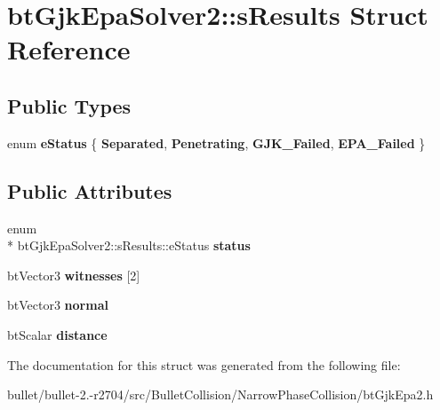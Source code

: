 \hypertarget{structbt_gjk_epa_solver2_1_1s_results}{\section{bt\+Gjk\+Epa\+Solver2\+:\+:s\+Results Struct Reference}
\label{structbt_gjk_epa_solver2_1_1s_results}
}
\subsection*{Public Types}
\begin{DoxyCompactItemize}
\item 
\hypertarget{structbt_gjk_epa_solver2_1_1s_results_afc87a476b5c94b203dec0b0d2f17e1b7}{enum {\bfseries e\+Status} \{ {\bfseries Separated}, 
{\bfseries Penetrating}, 
{\bfseries G\+J\+K\+\_\+\+Failed}, 
{\bfseries E\+P\+A\+\_\+\+Failed}
 \}}\label{structbt_gjk_epa_solver2_1_1s_results_afc87a476b5c94b203dec0b0d2f17e1b7}

\end{DoxyCompactItemize}
\subsection*{Public Attributes}
\begin{DoxyCompactItemize}
\item 
\hypertarget{structbt_gjk_epa_solver2_1_1s_results_a29cbe2f4110c25bb4897338cdea5ddaf}{enum \\*
bt\+Gjk\+Epa\+Solver2\+::s\+Results\+::e\+Status {\bfseries status}}\label{structbt_gjk_epa_solver2_1_1s_results_a29cbe2f4110c25bb4897338cdea5ddaf}

\item 
\hypertarget{structbt_gjk_epa_solver2_1_1s_results_aa9a1768be83dc3ef5ce1b4857f78058d}{bt\+Vector3 {\bfseries witnesses} \mbox{[}2\mbox{]}}\label{structbt_gjk_epa_solver2_1_1s_results_aa9a1768be83dc3ef5ce1b4857f78058d}

\item 
\hypertarget{structbt_gjk_epa_solver2_1_1s_results_aba3b090b5ecd5197bf241161b373b4af}{bt\+Vector3 {\bfseries normal}}\label{structbt_gjk_epa_solver2_1_1s_results_aba3b090b5ecd5197bf241161b373b4af}

\item 
\hypertarget{structbt_gjk_epa_solver2_1_1s_results_a5546e8142e330769c8c291827abcf37e}{bt\+Scalar {\bfseries distance}}\label{structbt_gjk_epa_solver2_1_1s_results_a5546e8142e330769c8c291827abcf37e}

\end{DoxyCompactItemize}


The documentation for this struct was generated from the following file\+:\begin{DoxyCompactItemize}
\item 
bullet/bullet-\/2.-\/r2704/src/\+Bullet\+Collision/\+Narrow\+Phase\+Collision/bt\+Gjk\+Epa2.\+h\end{DoxyCompactItemize}
